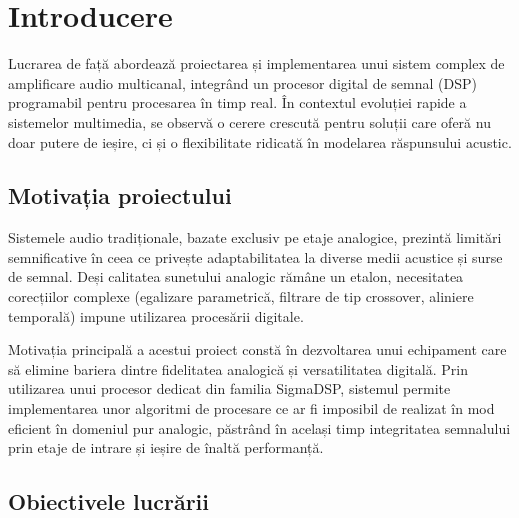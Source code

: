 \chapter*{Introducere}

Lucrarea de față abordează proiectarea și implementarea unui sistem complex de amplificare audio multicanal, integrând un procesor digital de semnal (DSP) programabil pentru procesarea în timp real. În contextul evoluției rapide a sistemelor multimedia, se observă o cerere crescută pentru soluții care oferă nu doar putere de ieșire, ci și o flexibilitate ridicată în modelarea răspunsului acustic.

\section*{Motivația proiectului}

Sistemele audio tradiționale, bazate exclusiv pe etaje analogice, prezintă limitări semnificative în ceea ce privește adaptabilitatea la diverse medii acustice și surse de semnal. Deși calitatea sunetului analogic rămâne un etalon, necesitatea corecțiilor complexe (egalizare parametrică, filtrare de tip crossover, aliniere temporală) impune utilizarea procesării digitale. 

Motivația principală a acestui proiect constă în dezvoltarea unui echipament care să elimine bariera dintre fidelitatea analogică și versatilitatea digitală. Prin utilizarea unui procesor dedicat din familia SigmaDSP\textregistered, sistemul permite implementarea unor algoritmi de procesare ce ar fi imposibil de realizat în mod eficient în domeniul pur analogic, păstrând în același timp integritatea semnalului prin etaje de intrare și ieșire de înaltă performanță.

\section*{Obiectivele lucrării}

